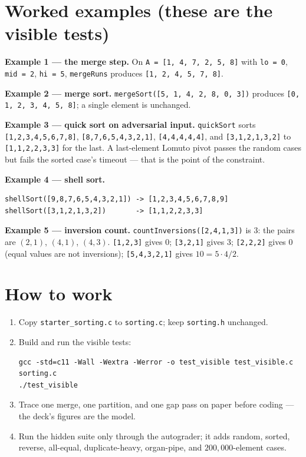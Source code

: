 \documentclass[11pt]{article}
\begin{document}
\section{Worked examples (these are the visible tests)}

\textbf{Example 1 --- the merge step.} On \texttt{A = [1, 4, 7, 2, 5, 8]} with \texttt{lo = 0}, \texttt{mid = 2}, \texttt{hi = 5}, \texttt{mergeRuns} produces \texttt{[1, 2, 4, 5, 7, 8]}.

\textbf{Example 2 --- merge sort.} \texttt{mergeSort([5, 1, 4, 2, 8, 0, 3])} produces \texttt{[0, 1, 2, 3, 4, 5, 8]}; a single element is unchanged.

\textbf{Example 3 --- quick sort on adversarial input.} \texttt{quickSort} sorts \texttt{[1,2,3,4,5,6,7,8]}, \texttt{[8,7,6,5,4,3,2,1]}, \texttt{[4,4,4,4,4]}, and \texttt{[3,1,2,1,3,2]} to \texttt{[1,1,2,2,3,3]} for the last. A last-element Lomuto pivot passes the random cases but fails the sorted case's timeout --- that is the point of the constraint.

\textbf{Example 4 --- shell sort.}
\begin{verbatim}
shellSort([9,8,7,6,5,4,3,2,1]) -> [1,2,3,4,5,6,7,8,9]
shellSort([3,1,2,1,3,2])       -> [1,1,2,2,3,3]
\end{verbatim}

\textbf{Example 5 --- inversion count.} \texttt{countInversions([2,4,1,3])} is $3$: the pairs are $(2,1)$, $(4,1)$, $(4,3)$. \texttt{[1,2,3]} gives $0$; \texttt{[3,2,1]} gives $3$; \texttt{[2,2,2]} gives $0$ (equal values are not inversions); \texttt{[5,4,3,2,1]} gives $10 = 5\cdot4/2$.

\section{How to work}

\begin{enumerate}
  \item Copy \texttt{starter\_sorting.c} to \texttt{sorting.c}; keep \texttt{sorting.h} unchanged.
  \item Build and run the visible tests:
\begin{verbatim}
gcc -std=c11 -Wall -Wextra -Werror -o test_visible test_visible.c sorting.c
./test_visible
\end{verbatim}
  \item Trace one merge, one partition, and one gap pass on paper before coding --- the deck's figures are the model.
  \item Run the hidden suite only through the autograder; it adds random, sorted, reverse, all-equal, duplicate-heavy, organ-pipe, and $200{,}000$-element cases.
\end{enumerate}
\end{document}
